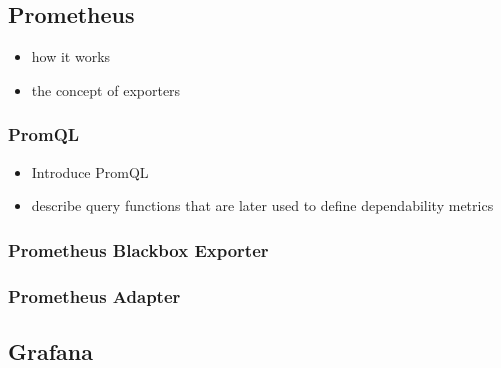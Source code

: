 \subsection{Prometheus}

\begin{itemize}
	\item how it works
	\item the concept of exporters
\end{itemize}

\subsubsection{PromQL} \label{background-promql}

\begin{itemize}
	\item Introduce PromQL
	\item describe query functions that are later used to define dependability metrics
\end{itemize}

\subsubsection{Prometheus Blackbox Exporter}

\subsubsection{Prometheus Adapter}


\subsection{Grafana}


